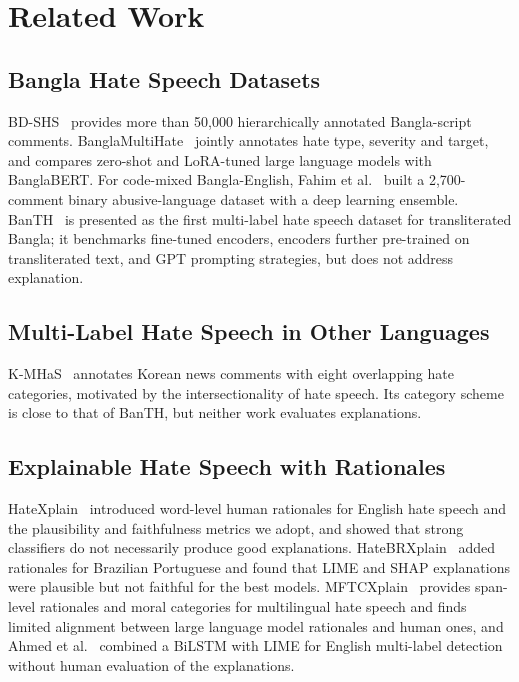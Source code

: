 \documentclass[conference,letterpaper,10pt]{IEEEtran}
\begin{document}
\section{Related Work}

\subsection{Bangla Hate Speech Datasets}
BD-SHS~\cite{romim2022bdshs} provides more than 50,000 hierarchically annotated Bangla-script comments. BanglaMultiHate~\cite{hasan2026banglamultihate} jointly annotates hate type, severity and target, and compares zero-shot and LoRA-tuned large language models with BanglaBERT. For code-mixed Bangla-English, Fahim et al.~\cite{fahim2025abusive} built a 2,700-comment binary abusive-language dataset with a deep learning ensemble. BanTH~\cite{haider2025banth} is presented as the first multi-label hate speech dataset for transliterated Bangla; it benchmarks fine-tuned encoders, encoders further pre-trained on transliterated text, and GPT prompting strategies, but does not address explanation.

\subsection{Multi-Label Hate Speech in Other Languages}
K-MHaS~\cite{lee2022kmhas} annotates Korean news comments with eight overlapping hate categories, motivated by the intersectionality of hate speech. Its category scheme is close to that of BanTH, but neither work evaluates explanations.

\subsection{Explainable Hate Speech with Rationales}
HateXplain~\cite{mathew2021hatexplain} introduced word-level human rationales for English hate speech and the plausibility and faithfulness metrics we adopt, and showed that strong classifiers do not necessarily produce good explanations. HateBRXplain~\cite{salles2025hatebrxplain} added rationales for Brazilian Portuguese and found that LIME and SHAP explanations were plausible but not faithful for the best models. MFTCXplain~\cite{trager2025mftcxplain} provides span-level rationales and moral categories for multilingual hate speech and finds limited alignment between large language model rationales and human ones, and Ahmed et al.~\cite{ahmed2024bilstmlime} combined a BiLSTM with LIME for English multi-label detection without human evaluation of the explanations.
\end{document}
